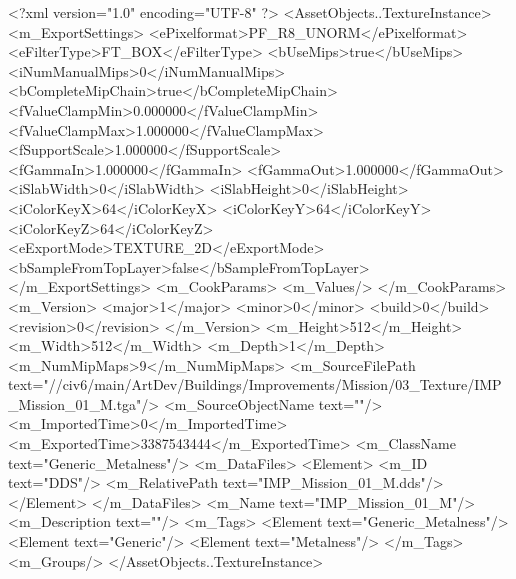 <?xml version="1.0" encoding="UTF-8" ?>
<AssetObjects..TextureInstance>
	<m_ExportSettings>
		<ePixelformat>PF_R8_UNORM</ePixelformat>
		<eFilterType>FT_BOX</eFilterType>
		<bUseMips>true</bUseMips>
		<iNumManualMips>0</iNumManualMips>
		<bCompleteMipChain>true</bCompleteMipChain>
		<fValueClampMin>0.000000</fValueClampMin>
		<fValueClampMax>1.000000</fValueClampMax>
		<fSupportScale>1.000000</fSupportScale>
		<fGammaIn>1.000000</fGammaIn>
		<fGammaOut>1.000000</fGammaOut>
		<iSlabWidth>0</iSlabWidth>
		<iSlabHeight>0</iSlabHeight>
		<iColorKeyX>64</iColorKeyX>
		<iColorKeyY>64</iColorKeyY>
		<iColorKeyZ>64</iColorKeyZ>
		<eExportMode>TEXTURE_2D</eExportMode>
		<bSampleFromTopLayer>false</bSampleFromTopLayer>
	</m_ExportSettings>
	<m_CookParams>
		<m_Values/>
	</m_CookParams>
	<m_Version>
		<major>1</major>
		<minor>0</minor>
		<build>0</build>
		<revision>0</revision>
	</m_Version>
	<m_Height>512</m_Height>
	<m_Width>512</m_Width>
	<m_Depth>1</m_Depth>
	<m_NumMipMaps>9</m_NumMipMaps>
	<m_SourceFilePath text="//civ6/main/ArtDev/Buildings/Improvements/Mission/03_Texture/IMP_Mission_01_M.tga"/>
	<m_SourceObjectName text=""/>
	<m_ImportedTime>0</m_ImportedTime>
	<m_ExportedTime>3387543444</m_ExportedTime>
	<m_ClassName text="Generic_Metalness"/>
	<m_DataFiles>
		<Element>
			<m_ID text="DDS"/>
			<m_RelativePath text="IMP_Mission_01_M.dds"/>
		</Element>
	</m_DataFiles>
	<m_Name text="IMP_Mission_01_M"/>
	<m_Description text=""/>
	<m_Tags>
		<Element text="Generic_Metalness"/>
		<Element text="Generic"/>
		<Element text="Metalness"/>
	</m_Tags>
	<m_Groups/>
</AssetObjects..TextureInstance>

